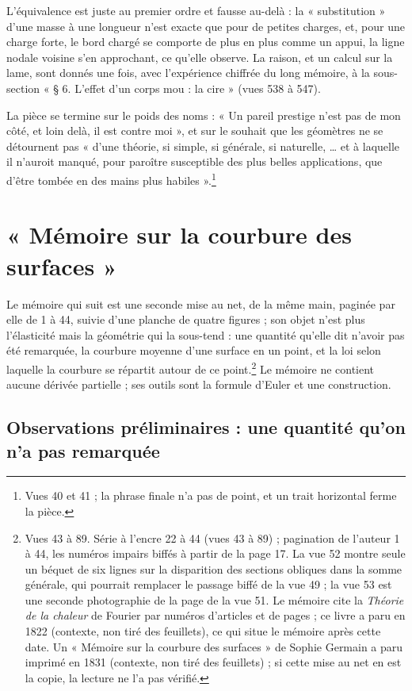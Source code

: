 \documentclass[11pt,a4paper]{article}
\begin{document}
L'équivalence est juste au premier ordre et fausse au-delà : la
« substitution » d'une masse à une longueur n'est exacte que pour de petites
charges, et, pour une charge forte, le bord chargé se comporte de plus en plus
comme un appui, la ligne nodale voisine s'en approchant, ce qu'elle observe. La
raison, et un calcul sur la lame, sont donnés une fois, avec l'expérience chiffrée
du long mémoire, à la sous-section « § 6. L'effet d'un corps mou : la cire »
(vues 538 à 547).

La pièce se termine sur le poids des noms : « Un pareil prestige n'est pas de
mon côté, et loin delà, il est contre moi », et sur le souhait que les géomètres
ne se détournent pas « d'une théorie, si simple, si générale, si naturelle,
… et à laquelle il n'auroit manqué, pour paroître susceptible des plus belles
applications, que d'être tombée en des mains plus habiles ».\footnote{Vues 40 et
41 ; la phrase finale n'a pas de point, et un trait horizontal ferme la
pièce.}

\section*{« Mémoire sur la courbure des surfaces »}

Le mémoire qui suit est une seconde mise au net, de la même main, paginée par
elle de 1 à 44, suivie d'une planche de quatre figures ; son objet n'est plus
l'élasticité mais la géométrie qui la sous-tend : une quantité qu'elle dit
n'avoir pas été remarquée, la courbure moyenne d'une surface en un point, et la
loi selon laquelle la courbure se répartit autour de ce point.\footnote{Vues 43 à
89. Série à l'encre 22 à 44 (vues 43 à 89) ; pagination de l'auteur 1 à 44, les
numéros impairs biffés à partir de la page 17. La vue 52 montre seule un béquet
de six lignes sur la disparition des sections obliques dans la somme générale,
qui pourrait remplacer le passage biffé de la vue 49 ; la vue 53 est une
seconde photographie de la page de la vue 51. Le mémoire cite la \emph{Théorie
de la chaleur} de Fourier par numéros d'articles et de pages ; ce livre a paru
en 1822 (contexte, non tiré des feuillets), ce qui situe le mémoire après
cette date. Un « Mémoire sur la courbure des surfaces » de Sophie Germain a
paru imprimé en 1831 (contexte, non tiré des feuillets) ; si cette mise au net
en est la copie, la lecture ne l'a pas vérifié.} Le mémoire ne contient aucune
dérivée partielle ; ses outils sont la formule d'Euler et une construction.

\subsection*{Observations préliminaires : une quantité qu'on n'a pas remarquée}
\end{document}
